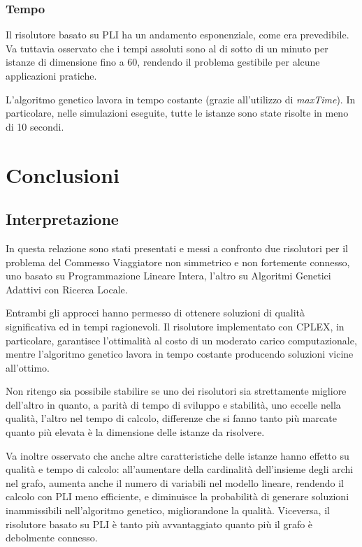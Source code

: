\documentclass[a4paper, 10pt]{report}
\begin{document}
\subsection{Tempo}
Il risolutore basato su PLI ha un andamento esponenziale, come era
prevedibile. Va tuttavia osservato che i tempi assoluti sono al di sotto
di un minuto per istanze di dimensione fino a 60, rendendo il problema
gestibile per alcune applicazioni pratiche.

L'algoritmo genetico lavora in tempo costante (grazie all'utilizzo di
\emph{maxTime}). In particolare, nelle simulazioni eseguite, tutte
le istanze sono state risolte in meno di 10 secondi.



\chapter{Conclusioni}
\section{Interpretazione}
\label{sec:conclusion_interpeting}
In questa relazione sono stati presentati e messi a confronto due
risolutori per il problema del Commesso Viaggiatore non simmetrico e
non fortemente connesso, uno basato su Programmazione Lineare Intera,
l'altro su Algoritmi Genetici Adattivi con Ricerca Locale.

Entrambi gli approcci hanno permesso di ottenere soluzioni di qualità
significativa ed in tempi ragionevoli. Il risolutore implementato con
CPLEX, in particolare, garantisce l'ottimalità al costo di un moderato
carico computazionale, mentre l'algoritmo genetico lavora in tempo
costante producendo soluzioni vicine all'ottimo.

Non ritengo sia possibile stabilire se uno dei risolutori sia
strettamente migliore dell'altro in quanto, a parità di tempo di sviluppo
e stabilità, uno eccelle nella qualità, l'altro nel tempo di calcolo,
differenze che si fanno tanto più marcate quanto più elevata è la
dimensione delle istanze da risolvere.

Va inoltre osservato che anche altre caratteristiche delle istanze hanno
effetto su qualità e tempo di calcolo: all'aumentare della cardinalità
dell'insieme degli archi nel grafo, aumenta anche il numero di variabili
nel modello lineare, rendendo il calcolo con PLI meno
efficiente, e diminuisce la probabilità di generare soluzioni
inammissibili nell'algoritmo genetico, migliorandone la qualità. Viceversa,
il risolutore basato su PLI è tanto più avvantaggiato quanto più il grafo
è debolmente connesso.
\end{document}
